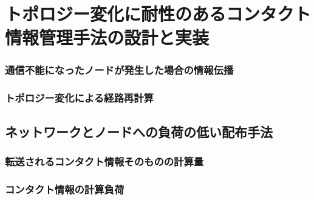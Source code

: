 \chapter{トポロジー変化に耐性のあるコンタクト情報管理手法の設計と実装}
\label{chap:design_and_impl}
\subsection{通信不能になったノードが発生した場合の情報伝播}
\subsection{トポロジー変化による経路再計算}
\section{ネットワークとノードへの負荷の低い配布手法}
\subsection{転送されるコンタクト情報そのものの計算量}
\subsection{コンタクト情報の計算負荷}
